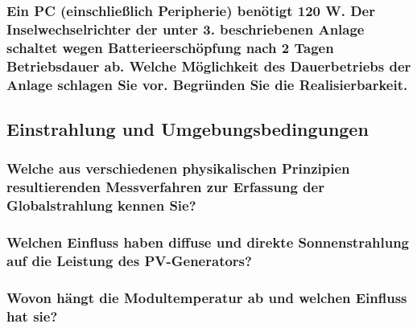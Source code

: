 \subsubsection{Ein PC (einschließlich Peripherie) benötigt 120 W. Der Inselwechselrichter der unter 3. beschriebenen Anlage schaltet wegen Batterieerschöpfung nach 2 Tagen Betriebsdauer ab. Welche Möglichkeit des Dauerbetriebs der Anlage schlagen Sie vor. Begründen Sie die Realisierbarkeit.}

\subsection{Einstrahlung und Umgebungsbedingungen}
\subsubsection{Welche aus verschiedenen physikalischen Prinzipien resultierenden Messverfahren zur Erfassung der Globalstrahlung kennen Sie?}
\subsubsection{Welchen Einfluss haben diffuse und direkte Sonnenstrahlung auf die Leistung des PV-Generators?}
\subsubsection{Wovon hängt die Modultemperatur ab und welchen Einfluss hat sie?}